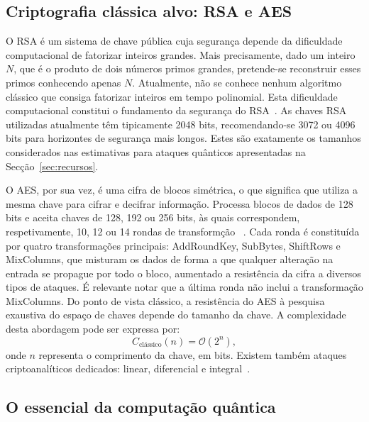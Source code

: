 \documentclass[11pt,a4paper]{article}
\begin{document}
\subsection{Criptografia clássica alvo: RSA e AES}\label{sec:classica}

O RSA é um sistema de chave pública cuja segurança depende da dificuldade computacional de fatorizar inteiros grandes. Mais precisamente, dado um inteiro $N$, que é o produto de dois números primos grandes, pretende-se reconstruir esses primos conhecendo apenas $N$. Atualmente, não se conhece nenhum algoritmo clássico que consiga fatorizar inteiros em tempo polinomial. Esta dificuldade computacional constitui o fundamento da segurança do RSA~\cite{oonishi2026,wang2022}. As chaves RSA utilizadas atualmente têm tipicamente 2048 bits, recomendando-se 3072 ou 4096 bits para horizontes de segurança mais longos. Estes são exatamente os tamanhos considerados nas estimativas para ataques quânticos apresentadas na Secção~\ref{sec:recursos}.

O AES, por sua vez, é uma cifra de blocos simétrica, o que significa que utiliza a mesma chave para cifrar e decifrar informação. Processa blocos de dados de 128 bits e aceita chaves de 128, 192 ou 256 bits, às quais correspondem, respetivamente, 10, 12 ou 14 rondas de transformção ~\cite{chethana2025,wang2022}. Cada ronda é constituída por quatro transformações principais: AddRoundKey, SubBytes, ShiftRows e MixColumns, que misturam os dados de forma a que qualquer alteração na entrada se propague por todo o bloco, aumentado a resistência da cifra a diversos tipos de ataques. É relevante notar que a última ronda não inclui a transformação MixColumns. Do ponto de vista clássico, a resistência do AES à pesquisa exaustiva do espaço de chaves depende do tamanho da chave. A complexidade desta abordagem pode ser expressa por:
\begin{equation}\label{eq:bruteforce}
C_{\text{clássico}}(n) = \mathcal{O}(2^{n}),
\end{equation}
onde $n$ representa o comprimento da chave, em bits. Existem também ataques criptoanalíticos dedicados: linear, diferencial e integral~\cite{chethana2025}.

\subsection{O essencial da computação quântica}\label{sec:quantica}
\end{document}
